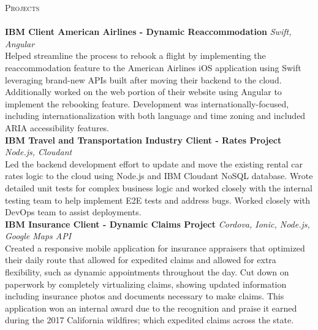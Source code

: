 \documentclass[a4paper]{article}
\newcommand{\lineunder} {
    \vspace*{-8pt} \\
    \hspace*{-18pt} \hrulefill \\
}
\newcommand{\header} [1] {
    {\hspace*{-18pt}\vspace*{6pt} \textsc{#1}}
    \vspace*{-6pt} \lineunder
}
\begin{document}
\vspace{2mm}
\header{Projects}
{\textbf{IBM Client American Airlines -  Dynamic Reaccommodation}} {\sl Swift, Angular} \\
Helped streamline the process to rebook a flight by implementing the reaccommodation feature to the American Airlines iOS application using Swift leveraging brand-new APIs built after moving their backend to the cloud. Additionally worked on the web portion of their website using Angular to implement the rebooking feature. Development was internationally-focused, including internationalization with both language and time zoning and included ARIA accessibility features.\\
\vspace*{2mm}
{\textbf{IBM Travel and Transportation Industry Client - Rates Project}} {\sl Node.js, Cloudant} \\
Led the backend development effort to update and move the existing rental car rates logic to the cloud using Node.js and IBM Cloudant NoSQL database. Wrote detailed unit tests for complex business logic and worked closely with the internal testing team to help implement E2E tests and address bugs. Worked closely with DevOps team to assist deployments.\\
\vspace*{2mm}
{\textbf{IBM Insurance Client  - Dynamic Claims Project}} {\sl Cordova, Ionic, Node.js, Google Maps API} \\
Created a responsive mobile application for insurance appraisers that optimized their daily route that allowed for expedited claims and allowed for extra flexibility, such as dynamic appointments throughout the day. Cut down on paperwork by completely virtualizing claims, showing updated information including insurance photos and documents necessary to make claims. This application won an internal award due to the recognition and praise it earned during the 2017 California wildfires; which expedited claims across the state.\\
\vspace*{2mm}
\end{document}
